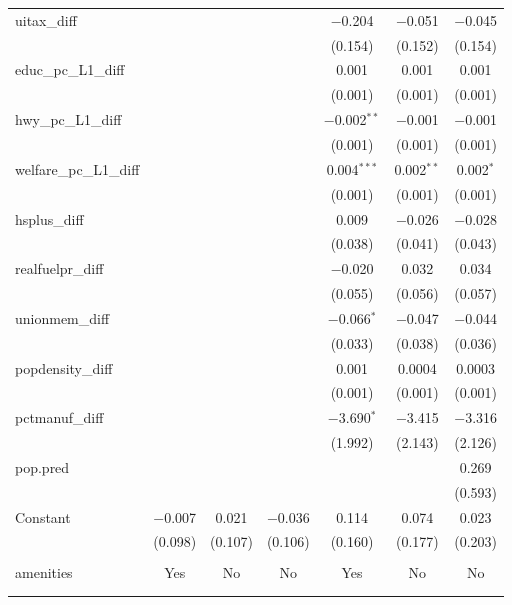 \begin{table}[!htbp]
\begin{tabular}{@{\extracolsep{5pt}}lcccccc}
  uitax\_diff &  &  &  & $-$0.204 & $-$0.051 & $-$0.045 \\ 
  &  &  &  & (0.154) & (0.152) & (0.154) \\ 
  educ\_pc\_L1\_diff &  &  &  & 0.001 & 0.001 & 0.001 \\ 
  &  &  &  & (0.001) & (0.001) & (0.001) \\ 
  hwy\_pc\_L1\_diff &  &  &  & $-$0.002$^{**}$ & $-$0.001 & $-$0.001 \\ 
  &  &  &  & (0.001) & (0.001) & (0.001) \\ 
  welfare\_pc\_L1\_diff &  &  &  & 0.004$^{***}$ & 0.002$^{**}$ & 0.002$^{*}$ \\ 
  &  &  &  & (0.001) & (0.001) & (0.001) \\ 
  hsplus\_diff &  &  &  & 0.009 & $-$0.026 & $-$0.028 \\ 
  &  &  &  & (0.038) & (0.041) & (0.043) \\ 
  realfuelpr\_diff &  &  &  & $-$0.020 & 0.032 & 0.034 \\ 
  &  &  &  & (0.055) & (0.056) & (0.057) \\ 
  unionmem\_diff &  &  &  & $-$0.066$^{*}$ & $-$0.047 & $-$0.044 \\ 
  &  &  &  & (0.033) & (0.038) & (0.036) \\ 
  popdensity\_diff &  &  &  & 0.001 & 0.0004 & 0.0003 \\ 
  &  &  &  & (0.001) & (0.001) & (0.001) \\ 
  pctmanuf\_diff &  &  &  & $-$3.690$^{*}$ & $-$3.415 & $-$3.316 \\ 
  &  &  &  & (1.992) & (2.143) & (2.126) \\ 
  pop.pred &  &  &  &  &  & 0.269 \\ 
  &  &  &  &  &  & (0.593) \\ 
  Constant & $-$0.007 & 0.021 & $-$0.036 & 0.114 & 0.074 & 0.023 \\ 
  & (0.098) & (0.107) & (0.106) & (0.160) & (0.177) & (0.203) \\ 
 \hline \\[-1.8ex] 
amenities & Yes & No & No & Yes & No & No \\ 
\hline \\[-1.8ex] 
\hline 
\hline \\[-1.8ex] 
\end{tabular} 
\end{table} 
